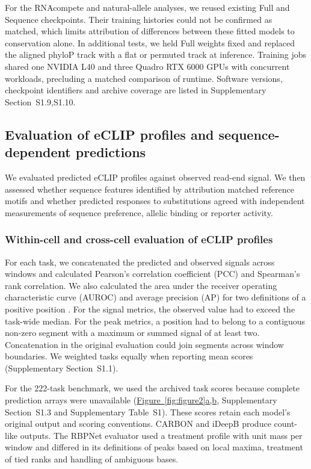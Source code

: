 \documentclass[webpdf,contemporary,large]{current_assets/oup-authoring-template}
\newcommand{\figpanelref}[2]{\hyperref[#1]{Figure~\ref*{#1}#2}}
\newcommand{\suptab}[1]{Supplementary Table~#1}
\newcommand{\supsect}[1]{Supplementary Section~#1}
\begin{document}
For the RNAcompete and natural-allele analyses, we reused existing Full and Sequence checkpoints. Their training histories could not be confirmed as matched, which limits attribution of differences between these fitted models to conservation alone. In additional tests, we held Full weights fixed and replaced the aligned phyloP track with a flat or permuted track at inference. Training jobs shared one NVIDIA L40 and three Quadro RTX 6000 GPUs with concurrent workloads, precluding a matched comparison of runtime. Software versions, checkpoint identifiers and archive coverage are listed in \supsect{S1.9,S1.10}.

\subsection{Evaluation of eCLIP profiles and sequence-dependent predictions}\label{subsec:metrics}

We evaluated predicted eCLIP profiles against observed read-end signal. We then assessed whether sequence features identified by attribution matched reference motifs and whether predicted responses to substitutions agreed with independent measurements of sequence preference, allelic binding or reporter activity.

\subsubsection{Within-cell and cross-cell evaluation of eCLIP profiles}

For each task, we concatenated the predicted and observed signals across windows and calculated Pearson's correlation coefficient (PCC) and Spearman's rank correlation. We also calculated the area under the receiver operating characteristic curve (AUROC) and average precision (AP) for two definitions of a positive position \citep{davis2006prroc,saito2015precision}. For the signal metrics, the observed value had to exceed the task-wide median. For the peak metrics, a position had to belong to a contiguous non-zero segment with a maximum or summed signal of at least two. Concatenation in the original evaluation could join segments across window boundaries. We weighted tasks equally when reporting mean scores (\supsect{S1.1}).

For the 222-task benchmark, we used the archived task scores because complete prediction arrays were unavailable (\figpanelref{fig:figure2}{a,b}, \supsect{S1.3} and \suptab{S1}). These scores retain each model's original output and scoring conventions. CARBON and iDeepB produce count-like outputs. The RBPNet evaluator used a treatment profile with unit mass per window and differed in its definitions of peaks based on local maxima, treatment of tied ranks and handling of ambiguous bases.
\end{document}
